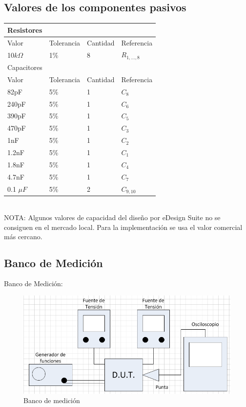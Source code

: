 \documentclass[12pt,a4paper]{article}
\begin{document}
\subsection{Valores de los componentes pasivos}

\begin{tabular}{| l | l | l | l |}
\hline
Resistores & & &\\ \hline
Valor & Tolerancia & Cantidad & Referencia\\ \hline
10$k\Omega$ & 1\% & 8 & $R_{1,\dots ,8}$\\ \hline
Capacitores & & & \\ \hline
Valor & Tolerancia & Cantidad & Referencia \\ \hline
82pF & 5\% & 1 & $C_8$\\ \hline
240pF & 5\% & 1 & $C_6$\\ \hline
390pF & 5\% & 1 & $C_5$ \\ \hline
470pF & 5\% & 1 & $C_3$ \\ \hline
1nF   &	5\% & 1 & $C_2$ \\ \hline
1.2nF & 5\% & 1 & $C_1$ \\ \hline
1.8nF & 5\% & 1 & $C_4$ \\ \hline
4.7nF & 5\% & 1 & $C_7$ \\ \hline
0.1 $\mu F$ & 5\% & 2 & $C_{9,10}$  \\ \hline
\end{tabular}\\

NOTA: Algunos valores de capacidad del diseño por eDesign Suite no se consiguen en el mercado local. Para la implementación se usa el valor comercial más cercano.

\subsection{Banco de Medición}

Banco de Medición:

\begin{figure}[H]
\centering
\includegraphics[width=\textwidth]{img/Banco.png}
\caption{Banco de medición}
\end{figure}
\end{document}
